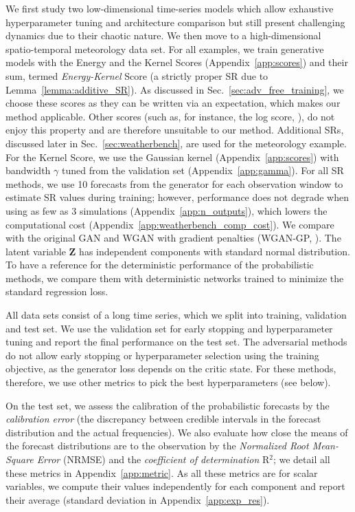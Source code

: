 \documentclass[twoside,11pt]{article}
\begin{document}
	
	We first study two low-dimensional time-series models which allow exhaustive hyperparameter tuning and architecture comparison but still present challenging dynamics due to their chaotic nature. We then move to a high-dimensional spatio-temporal meteorology data set.
	For all examples, we train generative models with the Energy and the Kernel Scores (Appendix~\ref{app:scores}) and their sum, termed \textit{Energy-Kernel} Score (a strictly proper SR due to Lemma~\ref{lemma:additive_SR}). As discussed in Sec.~\ref{sec:adv_free_training}, we choose these scores as they can be written via an expectation, which makes our method applicable. Other scores (such as, for instance, the log score, \citealp{gneiting2007strictly}), do not enjoy this property and are therefore unsuitable to our method. Additional SRs, discussed later in Sec.~\ref{sec:weatherbench}, are used for the meteorology example.
	For the Kernel Score, we use the Gaussian kernel (Appendix~\ref{app:scores}) with bandwidth $ \gamma $ tuned from the validation set (Appendix~\ref{app:gamma}). For all SR methods, we use 10 forecasts from the generator for each observation window to estimate SR values during training; however, performance does not degrade when using as few as 3 simulations (Appendix~\ref{app:n_outputs}), which lowers the computational cost (Appendix~\ref{app:weatherbench_comp_cost}).
	We compare with the original GAN \citep{goodfellow2014generative} and WGAN with gradient penalties (WGAN-GP, \citealp{gulrajani2017improved}). The latent variable $ \mathbf{Z} $ has independent components with standard normal distribution. To have a reference for the deterministic performance of the probabilistic methods, we compare them with deterministic networks trained to minimize the standard regression loss. 
	
	
	All data sets consist of a long time series, which we split into training, validation and test set.
	We use the validation set for early stopping and hyperparameter tuning and report the final performance on the test set. The adversarial methods do not allow early stopping or hyperparameter selection using the training objective, as the generator loss depends on the critic state. For these methods, 
	therefore, we use other metrics to pick the best hyperparameters (see below).
	
	
	On the test set, we assess the calibration of the probabilistic forecasts by the \textit{calibration error} (the discrepancy between credible intervals in the forecast distribution and the actual frequencies). We also evaluate how close the means of the forecast distributions are to the observation by the \textit{Normalized Root Mean-Square Error} (NRMSE) and the \textit{coefficient of determination} R$^2  $; we detail all these metrics in Appendix~\ref{app:metric}. As all these metrics are for scalar variables, we compute their values independently for each component and report their average (standard deviation in Appendix~\ref{app:exp_res}).
	
\end{document}

